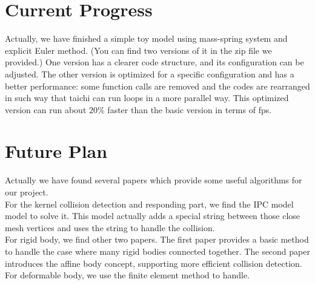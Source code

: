 \documentclass[SIGGRAPH]{acmart}
\begin{document}
\section{Current Progress}
Actually, we have finished a simple toy model using mass-spring system and explicit Euler method. (You can find two versions of it in the zip file we provided.) One version has a clearer code structure, and its configuration can be adjusted. The other version is optimized for a specific configuration and has a better performance: some function calls are removed and the codes are rearranged in such way that taichi can run loops in a more parallel way. This optimized version can run about $20\%$ faster than the basic version in terms of fps.

\section{Future Plan}
Actually we have found several papers which provide some useful algorithms for our project.\\
For the kernel collision detection and responding part, we find the  IPC model\cite{li2020incremental} model to solve it. This model actually adds a special string between those close mesh vertices and uses the string to handle the collision.\\
For rigid body, we find other two papers. The first paper\cite{liu2012quick} provides a basic method to handle the case where many rigid bodies connected together. The second paper\cite{lan2022affine} introduces the affine body concept, supporting more efficient collision detection.\\
For deformable body, we use the finite element method\cite{barbicsiggraph} to handle.




\end{document}

